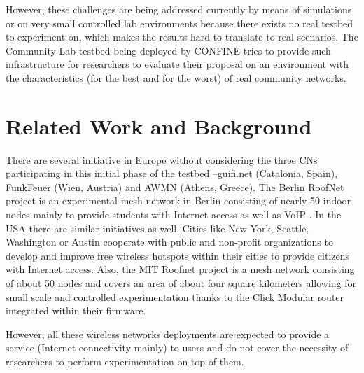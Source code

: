 \documentclass[conference]{IEEEtran}
\begin{document}

However, these challenges are being addressed currently by means of simulations 
or on very small controlled lab environments because there exists no real testbed
to experiment on, which makes the results hard to translate to real scenarios. The Community-Lab testbed
being deployed by CONFINE tries to provide such infrastructure for researchers to evaluate
their proposal on an environment with the characteristics (for the best and for the worst)
of real community networks.

\section{Related Work and Background}
\label{sec:related-work}

There are several initiative in Europe without considering the three CNs participating in this initial
phase of the testbed --guifi.net (Catalonia, Spain), FunkFeuer (Wien, Austria) and AWMN (Athens, Greece). The Berlin RoofNet project is an
experimental mesh network in Berlin consisting of nearly 50 indoor nodes mainly to provide
students with Internet access as well as VoIP \cite{berlin-roofnet}. In the USA there are similar initiatives as well. Cities like New York, Seattle, Washington or Austin cooperate with
public and non-profit organizations to develop and improve free wireless hotspots within 
their cities to provide citizens with Internet access. Also, the MIT Roofnet \cite{mit-roofnet} project
is a mesh network consisting of about 50 nodes and covers an area of about four square
kilometers allowing for small scale and controlled experimentation thanks to the
Click Modular router integrated within their firmware. 

However, all these wireless networks deployments 
are expected to provide a service (Internet connectivity mainly) to users and do not
cover the necessity of researchers to perform experimentation on top of them.

\end{document}
